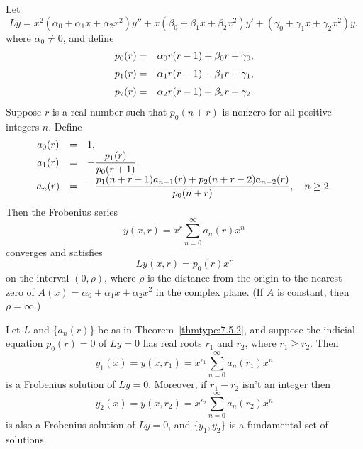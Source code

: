 \setcounter{theorem}{1}
\setcounter{equation}{11}
\begin{theorem}
  \label{thmtype:7.5.2} Let
  \[
    Ly= x^{2}(\alpha_{0}+\alpha_{1}x+\alpha_{2}x^{2})y''+x(\beta_{0}+\beta_{1}x+\beta_{2}x^{2})y' +(\gamma_{0}+\gamma_{1}x+\gamma_{2}x^{2})y,
  \]
  where $\alpha_{0}\ne0$, and define
  \begin{eqnarray*}
    p_{0}(r)&=&\alpha_{0}r(r-1)+\beta_{0}r+\gamma_{0},\\[1\jot] p_{1}(r)&=&\alpha_{1}r(r-1)+\beta_{1}r+\gamma_{1},\\[1\jot] p_{2}(r)&=&\alpha_{2}r(r-1)+\beta_{2}r+\gamma_{2}.\\
  \end{eqnarray*}
  Suppose $r$ is a real number such that $p_{0}(n+r)$ is nonzero for all positive integers $n$.
  Define
  \begin{equation}
    \label{eq:7.5.12}
    \begin{array}{ccl}
      a_{0}(r) & = & 1,                                                                                 \\
      a_{1}(r) & = & -\displaystyle\frac{p_{1}(r)}{p_{0}(r+1)},                                                  \\[2\jot]
      a_{n}(r) & = & -\displaystyle\frac{p_{1}(n+r-1)a_{n-1}(r)+p_{2}(n+r-2)a_{n-2}(r)}{p_{0}(n+r)},\quad n\ge2.
    \end{array}
  \end{equation}
  Then the Frobenius series
  \begin{equation}
    \label{eq:7.5.13}y(x,r)=x^{r}\sum_{n=0}^{\infty}a_{n}(r)x^{n}
  \end{equation}
  converges and satisfies
  \begin{equation}
    \label{eq:7.5.14}Ly(x,r)=p_{0}(r)x^{r}
  \end{equation}
  on the interval $(0,\rho)$, where $\rho$ is the distance from the origin to the nearest zero of
  $A(x)=\alpha_{0}+\alpha_{1}x+\alpha_{2}x^{2}$ in the complex plane. (If $A$ is constant, then
  $\rho=\infty$.)
\end{theorem}

\setcounter{theorem}{2}
\begin{theorem}
  \label{thmtype:7.5.3} Let $L$ and $\{a_{n}(r)\}$ be as in Theorem~\ref{thmtype:7.5.2}, and
  suppose the indicial equation $p_{0}(r)=0$ of $Ly=0$ has real roots $r_{1}$ and $r_{2}$, where
  $r_{1}\ge r_{2}$. Then
  \[
    y_{1}(x)=y(x,r_{1})=x^{r_{1}}\sum_{n=0}^{\infty}a_{n}(r_{1})x^{n}
  \]
  is a Frobenius solution of $Ly=0$. Moreover, if $r_{1}-r_{2}$ isn't an integer then
  \[
    y_{2}(x)=y(x,r_{2})=x^{r_{2}}\sum_{n=0}^{\infty}a_{n}(r_{2})x^{n}
  \]
  is also a Frobenius solution of $Ly=0$, and $\{y_{1},y_{2}\}$ is a fundamental set of solutions.
\end{theorem}

